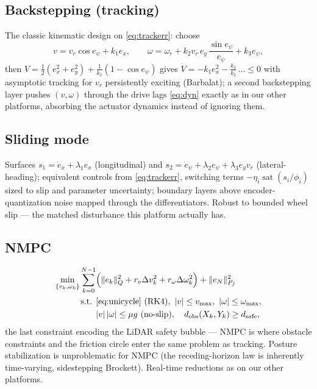 \documentclass[conference]{IEEEtran}
\newcommand{\sat}{\operatorname{sat}}
\begin{document}
\subsection{Backstepping (tracking)}
The classic kinematic design on \eqref{eq:trackerr}: choose
\begin{equation}
v = v_r\cos e_\psi + k_1 e_x,\qquad
\omega = \omega_r + k_2 v_r\, e_y\,\frac{\sin e_\psi}{e_\psi} + k_3 e_\psi,
\end{equation}
then $V = \tfrac12(e_x^2 + e_y^2) + \tfrac{1}{k_2}(1 - \cos e_\psi)$ gives
$\dot V = -k_1 e_x^2 - \tfrac{k_3}{k_2}\,\ldots \le 0$ with asymptotic tracking for $v_r$ persistently exciting (Barbalat); a second backstepping layer pushes $(v,\omega)$ through the drive lags \eqref{eq:dyn} exactly as in our other platforms, absorbing the actuator dynamics instead of ignoring them.

\subsection{Sliding mode}
Surfaces $s_1 = \dot e_x + \lambda_1 e_x$ (longitudinal) and $s_2 = \dot e_\psi + \lambda_2 e_\psi + \lambda_3 e_y v_r$ (lateral-heading); equivalent controls from \eqref{eq:trackerr}, switching terms $-\eta_i\sat(s_i/\phi_i)$ sized to slip and parameter uncertainty; boundary layers above encoder-quantization noise mapped through the differentiators. Robust to bounded wheel slip --- the matched disturbance this platform actually has.

\subsection{NMPC}
\begin{align}
\min_{\{v_k,\omega_k\}} \sum_{k=0}^{N-1}&\Bigl(\|e_k\|_Q^2 + r_v\Delta v_k^2 + r_\omega\Delta\omega_k^2\Bigr) + \|e_N\|_{P_f}^2\\
\text{s.t. } & \eqref{eq:unicycle}\ \text{(RK4)},\ |v|\le v_{\max},\ |\omega|\le\omega_{\max},\nonumber\\
& |v|\,|\omega|\le \mu g\ \text{(no-slip)},\quad d_{\mathrm{obs}}(X_k,Y_k)\ge d_{\mathrm{safe}},\nonumber
\end{align}
the last constraint encoding the LiDAR safety bubble --- NMPC is where obstacle constraints and the friction circle enter the same problem as tracking. Posture stabilization is unproblematic for NMPC (the receding-horizon law is inherently time-varying, sidestepping Brockett). Real-time reductions as on our other platforms.
\end{document}
